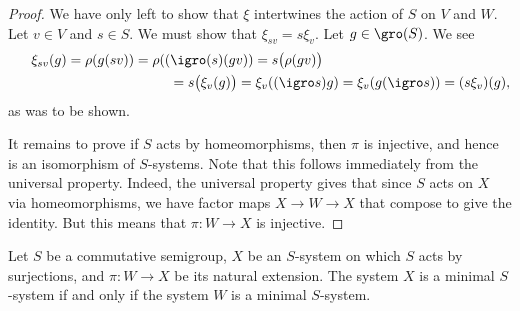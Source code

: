 \begin{proof}
    We have only left to show that $\xi$ intertwines the action of $S$ on $V$ and $W$.  Let $v \in V$ and $s \in S$.  We must show that $\xi_{sv} = s \xi_v$.  Let $g \in \gro(S)$.  We see
    \begin{gather*}
        \xi_{sv}(g) = \rho(g(sv)) = \rho ((\igro(s) (gv)) = s \big(\rho (gv)\big) \qquad \qquad \qquad \qquad \qquad \qquad \\
        \qquad \qquad \qquad \qquad \qquad \qquad = s \big(\xi_v(g)\big) = \xi_v( (\igro s) g) = \xi_v( g(\igro s)) = (s \xi_v) (g),
    \end{gather*}
    as was to be shown.

    It remains to prove if $S$ acts by homeomorphisms, then $\pi$ is injective, and hence is an isomorphism of $S$-systems. Note that this follows immediately from the universal property.  Indeed, the universal property gives that since $S$ acts on $X$ via homeomorphisms, we have factor maps $X \to W \to X$ that compose to give the identity.  But this means that $\pi: W \to X$ is injective.
\end{proof}

\begin{theorem}
    \label{lemma_nat_ext_minimal}
    Let $S$ be a commutative semigroup, $X$ be an $S$-system on which $S$ acts by surjections, and $\pi: W \to X$ be its natural extension.  The system $X$ is a minimal $S$-system if and only if the system $W$ is a minimal $S$-system.
\end{theorem}

